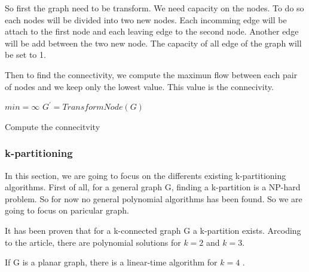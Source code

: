 So first the graph need to be transform. We need capacity on the nodes. To do so each nodes will be divided into two new nodes. Each incomming edge will be attach to the first node and each leaving edge to the second node. Another edge will be add between the two new node.
The capacity of all edge of the graph will be set to 1.

Then to find the connectivity, we compute the maximun flow between each pair of nodes and we keep only the lowest value. This value is the connecivity.


\begin{algorithm}[!h]
    $min = \infty$\;
    $G^{'} = TransformNode(G)$\;
    \;
    \caption{Compute the connecitvity}
\end{algorithm}

\subsubsection{k-partitioning}
In this section, we are going to focus on the differents existing k-partitioning algorithms.
First of all, for a general graph G, finding a k-partition is a NP-hard problem\cite{Dyer1985139}.
So for now no general polynomial algorithms has been found.
So we are going to focus on paricular graph.

It has been proven that for a k-connected graph G a k-partition exists\cite{GE78,LL77}.
Arcoding to the article, there are polynomial solutions for $k=2$\cite{GE78,LL77} and $k=3$.

If G is a planar graph, there is a linear-time algorithm for $k = 4$ \cite{Nakano1997315}.




